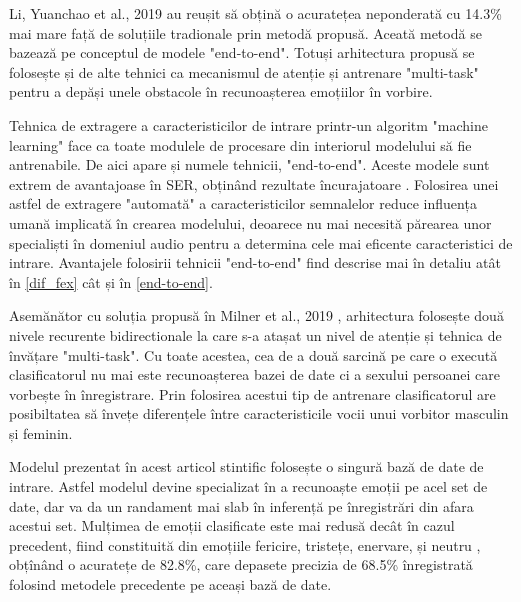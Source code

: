 \documentclass[a4paper,12pt]{book}
\begin{document}
					Li, Yuanchao et al., 2019 \cite{yuan} au reușit să obțină o acuratețea neponderată cu 14.3\% mai mare față de soluțiile tradionale prin metodă propusă. Aceată metodă se bazează pe conceptul de modele "end-to-end". Totuși arhitectura propusă se folosește și de alte tehnici ca mecanismul de atenție și antrenare "multi-task" pentru a depăși unele obstacole în recunoașterea emoțiilor în vorbire. \par
					
					Tehnica de extragere a caracteristicilor de intrare printr-un algoritm "machine learning" face ca toate modulele de procesare din interiorul modelului să fie antrenabile. De aici apare și numele tehnicii, "end-to-end". Aceste modele sunt extrem de avantajoase în SER, obținând rezultate încurajatoare \cite{adieu,e2e}. Folosirea unei astfel de extragere "automată" a caracteristicilor semnalelor reduce influența umană implicată în crearea modelului, deoarece nu mai necesită părearea unor specialiști în domeniul audio pentru a determina cele mai eficente caracteristici de intrare. Avantajele folosirii tehnicii "end-to-end" find descrise mai în detaliu atât în \ref{dif_fex} cât și în \ref{end-to-end}. \par
					
					Asemănător cu soluția propusă în Milner et al., 2019 \cite{multi-domain}, arhitectura folosește două nivele recurente bidirectionale la care s-a atașat un nivel de atenție și tehnica de  învățare "multi-task". Cu toate acestea, cea de a două sarcină pe care o execută clasificatorul nu mai este recunoașterea bazei de date ci a sexului persoanei care vorbește în înregistrare. Prin folosirea acestui tip de antrenare clasificatorul are posibiltatea să învețe diferențele între caracteristicile vocii unui vorbitor masculin și feminin. \par
					
					Modelul prezentat în acest articol stintific folosește o singură bază de date de intrare. Astfel modelul devine specializat în a recunoaște emoții pe acel set de date, dar va da un randament mai slab în inferență pe înregistrări din afara acestui set. Mulțimea de emoții clasificate este mai redusă  decât în cazul precedent, fiind constituită din emoțiile fericire, tristețe, enervare, și neutru , obțînând o acuratețe de 82.8\%, care depasete precizia de 68.5\% înregistrată folosind metodele precedente pe aceași bază de date.
\end{document}
